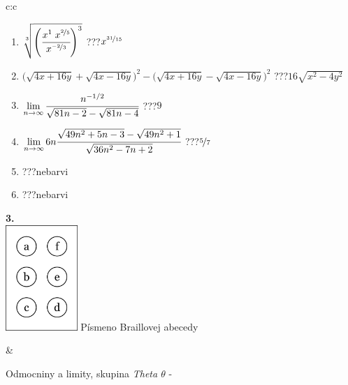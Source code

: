 \documentclass[10pt]{report}
\begin{document}
\begin{tabular}{c:c}
\begin{minipage}[c][104.5mm][t]{0.5\linewidth}
\begin{center}
\begin{minipage}{0.79\linewidth}
\begin{center}
\begin{varwidth}{\linewidth}
\begin{enumerate}
\small
\item $\sqrt[3]{\left(\cfrac{x^{1}\;x^{\nicefrac{2}{5}}}{x^{\nicefrac{-2}{3}}}\right)^{3}}$\quad \dotfill\; ???\;\dotfill \quad $x^{\nicefrac{31}{15}}$
\item {\footnotesize{\scriptsize$\big(\sqrt{4x+16y}+\sqrt{4x-16y}\big)^2-\big(\sqrt{4x+16y}-\sqrt{4x-16y}\big)^2$}\quad \dotfill\; ???\;\dotfill \quad $16\sqrt{x^2-4y^2}$}
\item $\lim\limits_{n\to\infty}\cfrac{n^{-1/2}}{\sqrt{81n-2}-\sqrt{81n-4}}$\quad \dotfill\; ???\;\dotfill \quad $9$
\item $\lim\limits_{n\to\infty}6n\cfrac{\sqrt{49n^2+5n-3}-\sqrt{49n^2+1}}{\sqrt{36n^2-7n+2}}$\quad \dotfill\; ???\;\dotfill \quad $\nicefrac{5}{7}$
\item \quad \dotfill\; ???\;\dotfill \quad nebarvi
\item \quad \dotfill\; ???\;\dotfill \quad nebarvi
\end{enumerate}
\end{varwidth}
\end{center}
\end{minipage}
\begin{minipage}{0.20\linewidth}
\begin{center}
{\Huge\bfseries 3.} \\[2mm]
\includegraphics[height=40mm]{../images/braille.png}
{\small Písmeno Braillovej abecedy}
\end{center}
\end{minipage}
\end{center}
\end{minipage}
&
\begin{minipage}[c][104.5mm][t]{0.5\linewidth}
\begin{center}
\vspace{7mm}
{\huge Odmocniny a limity, skupina \textit{Theta $\theta$} -}\\[5mm]

\end{center}
\end{minipage}
\end{tabular}
\end{document}
